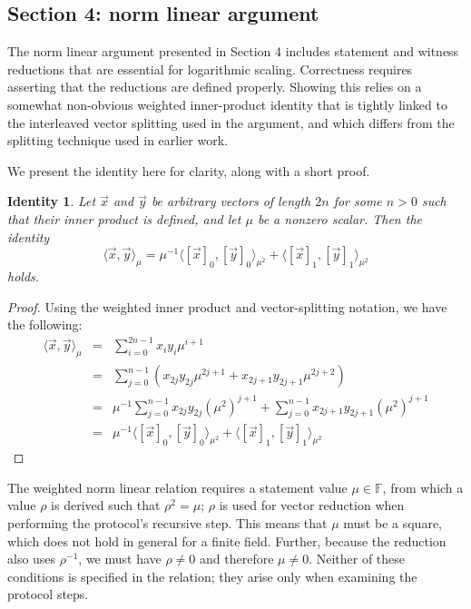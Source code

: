 \documentclass{article}
\newtheorem*{identity}{Identity}
\begin{document}
\subsection{Section 4: norm linear argument}

The norm linear argument presented in Section 4 includes statement and witness reductions that are essential for logarithmic scaling.
Correctness requires asserting that the reductions are defined properly.
Showing this relies on a somewhat non-obvious weighted inner-product identity that is tightly linked to the interleaved vector splitting used in the argument, and which differs from the splitting technique used in earlier work.

We present the identity here for clarity, along with a short proof.

\begin{identity}
Let $\vec{x}$ and $\vec{y}$ be arbitrary vectors of length $2n$ for some $n > 0$ such that their inner product is defined, and let $\mu$ be a nonzero scalar.
Then the identity
$$\langle \vec{x}, \vec{y} \rangle_\mu = \mu^{-1} \langle [\vec{x}]_0, [\vec{y}]_0 \rangle_{\mu^2} + \langle [\vec{x}]_1, [\vec{y}]_1 \rangle_{\mu^2}$$
holds.
\end{identity}

\begin{proof}
Using the weighted inner product and vector-splitting notation, we have the following:
\begin{eqnarray*}
	\langle \vec{x}, \vec{y} \rangle_\mu &=& \sum_{i=0}^{2n-1} x_i y_i \mu^{i+1} \\
	&=& \sum_{j=0}^{n-1} \left( x_{2j} y_{2j} \mu^{2j+1} + x_{2j+1} y_{2j+1} \mu^{2j+2} \right) \\
	&=& \mu^{-1} \sum_{j=0}^{n-1} x_{2j} y_{2j} (\mu^2)^{j+1} + \sum_{j=0}^{n-1} x_{2j+1} y_{2j+1} (\mu^2)^{j+1} \\
	&=& \mu^{-1} \langle [\vec{x}]_0, [\vec{y}]_0 \rangle_{\mu^2} + \langle [\vec{x}]_1, [\vec{y}]_1 \rangle_{\mu^2}
\end{eqnarray*}
\end{proof}

The weighted norm linear relation requires a statement value $\mu \in \mathbb{F}$, from which a value $\rho$ is derived such that $\rho^2 = \mu$; $\rho$ is used for vector reduction when performing the protocol's recursive step.
This means that $\mu$ must be a square, which does not hold in general for a finite field.
Further, because the reduction also uses $\rho^{-1}$, we must have $\rho \neq 0$ and therefore $\mu \neq 0$.
Neither of these conditions is specified in the relation; they arise only when examining the protocol steps.
\end{document}
